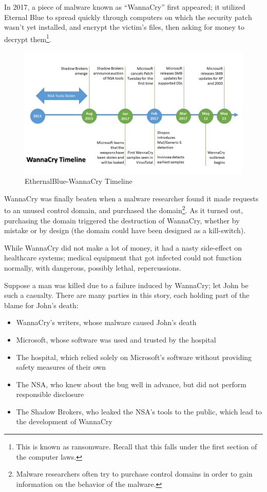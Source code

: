 In 2017, a piece of malware known as “WannaCry” first appeared; it utilized Eternal Blue to spread quickly through computers on which the security patch wasn't yet installed, and encrypt the victim’s files, then asking for money to decrypt them\footnote{This is known as ransomware. Recall that this falls under the first section of the computer laws.}.

\begin{figure}[!ht]
    \centering
    \includegraphics[width=\textwidth]{images/EthernalBlue-WannaCry_Timeline.jpg}
    \caption{EthernalBlue-WannaCry Timeline}
    \label{fig:wannacry_timeline}
\end{figure}


WannaCry was finally beaten when a malware researcher found it made requests to an unused control domain, and purchased the domain\footnote{Malware researchers often try to purchase control domains in order to gain information on the behavior of the malware.}. As it turned out, purchasing the domain triggered the destruction of WannaCry, whether by mistake or by design (the domain could have been designed as a kill-switch).


While WannaCry did not make a lot of money, it had a nasty side-effect on healthcare systems; medical equipment that got infected could not function normally, with dangerous, possibly lethal, repercussions.


Suppose a man was killed due to a failure induced by WannaCry; let John be such a casualty. There are many parties in this story, each holding part of the blame for John’s death:
\begin{itemize}
    \item WannaCry’s writers, whose malware caused John’s death
    \item Microsoft, whose software was used and trusted by the hospital
    \item The hospital, which relied solely on Microsoft’s software without providing safety measures of their own
    \item The NSA, who knew about the bug well in advance, but did not perform responsible disclosure
    \item The Shadow Brokers, who leaked the NSA’s tools to the public, which lead to the development of WannaCry
\end{itemize}


